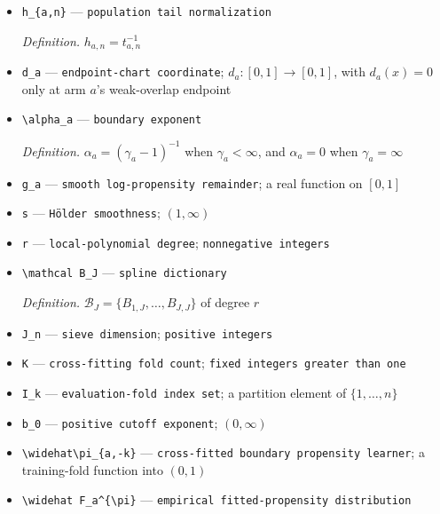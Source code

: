 \documentclass{article}
\begin{document}
\begin{itemize}
  \par\smallskip\noindent\emph{Definition.} \(t_{a,n}=\inf\{t\in(0,1]:ntF_a^{\pi}(t)\ge1\}\), with \(\inf\varnothing=1\)
  \item \texttt{h\_\allowbreak{}\{a,\allowbreak{}n\}\allowbreak{}} --- \texttt{population tail normalization}
  \par\smallskip\noindent\emph{Definition.} \(h_{a,n}=t_{a,n}^{-1}\)
  \item \texttt{d\_\allowbreak{}a} --- \texttt{endpoint-\allowbreak{}chart coordinate}; \(d_a:[0,1]\to[0,1]\), with \(d_a(x)=0\) only at arm \(a\)'s weak-overlap endpoint
  \item \texttt{\textbackslash{}\allowbreak{}alpha\_\allowbreak{}a} --- \texttt{boundary exponent}
  \par\smallskip\noindent\emph{Definition.} \(\alpha_a=(\gamma_a-1)^{-1}\) when \(\gamma_a<\infty\), and \(\alpha_a=0\) when \(\gamma_a=\infty\)
  \item \texttt{g\_\allowbreak{}a} --- \texttt{smooth log-\allowbreak{}propensity remainder}; a real function on \([0,1]\)
  \item \texttt{s} --- \texttt{Hölder smoothness}; \((1,\infty)\)
  \item \texttt{r} --- \texttt{local-\allowbreak{}polynomial degree}; \texttt{nonnegative integers}
  \item \texttt{\textbackslash{}\allowbreak{}mathcal B\_\allowbreak{}J} --- \texttt{spline dictionary}
  \par\smallskip\noindent\emph{Definition.} \(\mathcal B_J=\{B_{1,J},\ldots,B_{J,J}\}\) of degree \(r\)
  \item \texttt{J\_\allowbreak{}n} --- \texttt{sieve dimension}; \texttt{positive integers}
  \item \texttt{K} --- \texttt{cross-\allowbreak{}fitting fold count}; \texttt{fixed integers greater than one}
  \item \texttt{I\_\allowbreak{}k} --- \texttt{evaluation-\allowbreak{}fold index set}; a partition element of \(\{1,\ldots,n\}\)
  \item \texttt{b\_\allowbreak{}0} --- \texttt{positive cutoff exponent}; \((0,\infty)\)
  \item \texttt{\textbackslash{}\allowbreak{}widehat\textbackslash{}\allowbreak{}pi\_\allowbreak{}\{a,\allowbreak{}-\allowbreak{}k\}\allowbreak{}} --- \texttt{cross-\allowbreak{}fitted boundary propensity learner}; a training-fold function into \((0,1)\)
  \item \texttt{\textbackslash{}\allowbreak{}widehat F\_\allowbreak{}a\textasciicircum{}\{\textbackslash{}\allowbreak{}pi\}\allowbreak{}} --- \texttt{empirical fitted-\allowbreak{}propensity distribution}

\end{itemize}
\end{document}
